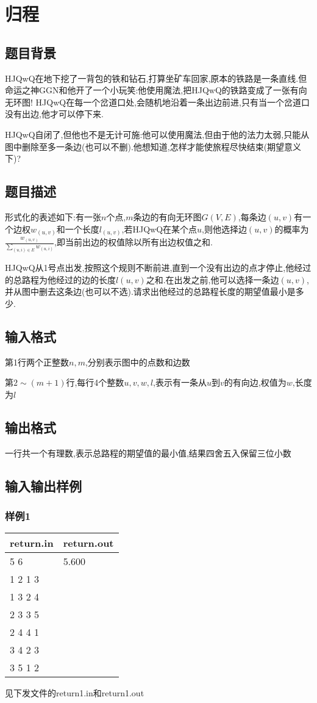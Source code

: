 \documentclass[12pt]{ctexart}
\begin{document}
\section{归程}
\subsection{题目背景}
HJQwQ在地下挖了一背包的铁和钻石,打算坐矿车回家,原本的铁路是一条直线.但命运之神GGN和他开了一个小玩笑:他使用魔法,把HJQwQ的铁路变成了一张有向无环图! HJQwQ在每一个岔道口处,会随机地沿着一条出边前进,只有当一个岔道口没有出边,他才可以停下来.

HJQwQ自闭了,但他也不是无计可施:他可以使用魔法,但由于他的法力太弱,只能从图中删除至多一条边(也可以不删).他想知道,怎样才能使旅程尽快结束(期望意义下)?
\subsection{题目描述}
形式化的表述如下:有一张$n$个点,$m$条边的有向无环图$G(V,E)$,每条边$(u,v)$有一个边权$w_{(u,v)}$和一个长度$l_{(u,v)}$,若HJQwQ在某个点$u$,则他选择边$(u,v)$的概率为$\frac{w_{(u,v)}}{\sum\limits_{(u,i)\in E}w_{(u,i)}}$,即当前出边的权值除以所有出边权值之和.

HJQwQ从1号点出发,按照这个规则不断前进,直到一个没有出边的点才停止,他经过的总路程为他经过的边的长度$l(u,v)$之和.在出发之前,他可以选择一条边$(u,v)$,并从图中删去这条边(也可以不选).请求出他经过的总路程长度的期望值最小是多少.
\subsection{输入格式}
第1行两个正整数$n,m$,分别表示图中的点数和边数

第$2\sim(m+1)$行,每行4个整数$u,v,w,l$,表示有一条从$u$到$v$的有向边,权值为$w$,长度为$l$
\subsection{输出格式}
一行共一个有理数,表示总路程的期望值的最小值,结果四舍五入保留三位小数
\subsection{输入输出样例}
\subsubsection{样例1}
\begin{center}
	\begin{tabular}{|p{6cm}|p{6cm}|}
		\hline return.in&return.out\\
		\hline	5 6&5.600\\
				1 2 1 3&\\
				1 3 2 4&\\
				2 3 3 5&\\
				2 4 4 1&\\
				3 4 2 3&\\
				3 5 1 2&\\
		\hline
	\end{tabular}
\end{center}
见下发文件的return1.in和return1.out
\end{document}
